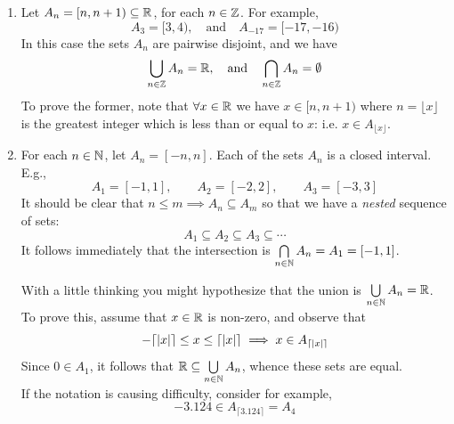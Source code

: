  
\begin{examples}{}{}
	\begin{enumerate}
	\item\label{ex:index2} Let $A_n=[n,n+1)\subseteq\mathbb{R}$, for each $n\in\mathbb{Z}$. For example,
	\[
		A_3=[3,4),\quad\text{and}\quad A_{-17}=[-17,-16)
	\]
In this case the sets $A_n$ are pairwise disjoint, and we have
	\[
		\bigcup\limits_{n\in\mathbb{Z}}A_n=\mathbb{R},\quad\text{and}\quad\bigcap\limits_{n\in\mathbb{Z}}A_n=\emptyset
	\]
To prove the former, note that $\forall x\in\mathbb{R}$ we have $x\in[n,n+1)$ where $n=\lfloor x\rfloor$ is the greatest integer which is less than or equal to $x$: i.e. $x\in A_{\lfloor x\rfloor}$.


	\item\vspace*{5pt} For each $n\in\mathbb{N}$, let $A_n=[-n,n]$. Each of the sets $A_n$ is a closed interval. E.g.,
	\[
		A_1=[-1,1],\qquad A_2=[-2,2],\qquad A_3=[-3,3]
	\]
	It should be clear that $n\le m\implies A_n\subseteq A_m$ so that we have a \emph{nested} sequence of sets:
	\[
		A_1\subseteq A_2\subseteq A_3\subseteq\cdots
	\]
	It follows immediately that the intersection is $\bigcap\limits_{n\in\mathbb{N}}A_n=A_1=[-1,1]$.\par
	With a little thinking you might hypothesize that the union is $\bigcup\limits_{n\in\mathbb{N}}A_n=\mathbb{R}$. To prove this, assume that $x\in\mathbb{R}$ is non-zero, and observe that
	\[
		-\lceil\left| x\right|\rceil\le x\le\lceil\left| x\right|\rceil\implies x\in A_{\lceil\left| x\right|\rceil}
	\]
	Since $0\in A_1$, it follows that $\mathbb{R}\subseteq\bigcup\limits_{n\in\mathbb{N}}A_n$, whence these sets are equal.\\
	If the notation is causing difficulty, consider for example,
	\[
		-3.124\in A_{\lceil 3.124\rceil}=A_4
	\]
	

\end{enumerate}
\end{examples}
